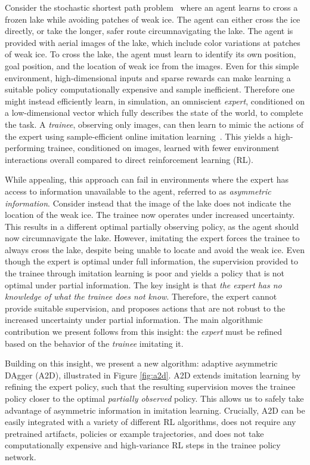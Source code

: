 \label{sec:intro}
Consider the stochastic shortest path problem~\citep{bertsekas1991analysis} where an agent learns to cross a frozen lake while avoiding patches of weak ice. The agent can either cross the ice directly, or take the longer, safer route circumnavigating the lake.  The agent is provided with aerial images of the lake, which include color variations at patches of weak ice.  To cross the lake, the agent must learn to identify its own position, goal position, and the location of weak ice from the images.  Even for this simple environment, high-dimensional inputs and sparse rewards can make learning a suitable policy computationally expensive and sample inefficient.  Therefore one might instead efficiently learn, in simulation, an omniscient \emph{expert}, conditioned on a low-dimensional vector which fully describes the state of the world, to complete the task. A \emph{trainee}, observing only images, can then learn to mimic the actions of the expert using sample-efficient online imitation learning~\citep{Ross2011}. This yields a high-performing trainee, conditioned on images, learned with fewer environment interactions overall compared to direct reinforcement learning (RL). 

While appealing, this approach can fail in environments where the expert has access to information unavailable to the agent, referred to as \emph{asymmetric information}.  Consider instead that the image of the lake does not indicate the location of the weak ice.  The trainee now operates under increased uncertainty.  This results in a different optimal partially observing policy, as the agent should now circumnavigate the lake.  However, imitating the expert forces the trainee to always cross the lake, despite being unable to locate and avoid the weak ice. Even though the expert is optimal under full information, the supervision provided to the trainee through imitation learning is poor and yields a policy that is not optimal under partial information. The key insight is that \emph{the expert has no knowledge of what the trainee does not know}.  Therefore, the expert cannot provide suitable supervision, and proposes actions that are not robust to the increased uncertainty under partial information. The main algorithmic contribution we present follows from this insight: the \emph{expert} must be refined based on the behavior of the \emph{trainee} imitating it.

Building on this insight, we present a new algorithm: adaptive asymmetric DAgger (A2D), illustrated in Figure \ref{fig:a2d}.  A2D extends imitation learning by refining the expert policy, such that the resulting supervision moves the trainee policy closer to the optimal \emph{partially observed} policy.  This allows us to safely take advantage of asymmetric information in imitation learning.  Crucially, A2D can be easily integrated with a variety of different RL algorithms, does not require any pretrained artifacts, policies or example trajectories, and does not take computationally expensive and high-variance RL steps in the trainee policy network.  

